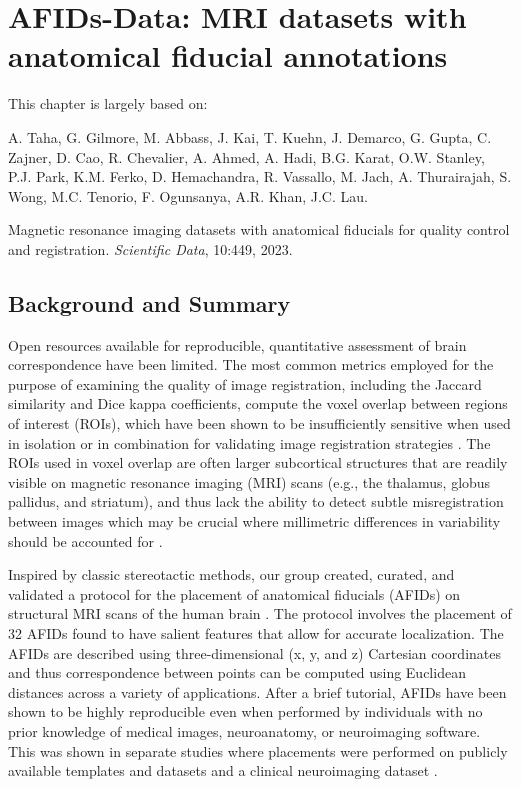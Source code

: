 \chapter{AFIDs-Data: MRI datasets with anatomical fiducial annotations}\label{chap:afidsdata}
\newpage
\sloppy
\noindent This chapter is largely based on:
\begin{itemize}[noitemsep,topsep=0pt]
    \begin{small}
    \item
    A. Taha, G. Gilmore, M. Abbass, J. Kai, T. Kuehn, J. Demarco, G. Gupta, C. Zajner, D. Cao, R. Chevalier, A. Ahmed, A. Hadi, B.G. Karat, O.W. Stanley, P.J. Park, K.M. Ferko, D. Hemachandra, R. Vassallo, M. Jach, A. Thurairajah, S. Wong, M.C. Tenorio, F. Ogunsanya, A.R. Khan, J.C. Lau.
    \end{small} Magnetic resonance imaging datasets with anatomical fiducials for quality control and registration. \textit{Scientific Data}, 10:449, 2023.
    
\end{itemize}

\section{Background and Summary}
Open resources available for reproducible, quantitative assessment of brain correspondence have been limited. The most common metrics employed for the purpose of examining the quality of image registration, including the Jaccard similarity and Dice kappa coefficients, compute the voxel overlap between regions of interest (ROIs), which have been shown to be insufficiently sensitive when used in isolation or in combination for validating image registration strategies \cite{Rohlfing2012-kt}. The ROIs used in voxel overlap are often larger subcortical structures that are readily visible on magnetic resonance imaging (MRI) scans (e.g., the thalamus, globus pallidus, and striatum), and thus lack the ability to detect subtle misregistration between images which may be crucial where millimetric differences in variability should be accounted for \cite{Rohlfing2012-kt,Lau2019-eh,Abbass2022-lf,Chakravarty2009-kq}.

Inspired by classic stereotactic methods, our group created, curated, and validated a protocol for the placement of anatomical fiducials (AFIDs) on structural MRI scans of the human brain \cite{Lau2019-eh}. The protocol involves the placement of 32 AFIDs found to have salient features that allow for accurate localization. The AFIDs are described using three-dimensional (x, y, and z) Cartesian coordinates and thus correspondence between points can be computed using Euclidean distances across a variety of applications. After a brief tutorial, AFIDs have been shown to be highly reproducible even when performed by individuals with no prior knowledge of medical images, neuroanatomy, or neuroimaging software. This was shown in separate studies where placements were performed on publicly available templates and datasets \cite{Lau2019-eh} and a clinical neuroimaging dataset \cite{Abbass2022-lf}.


